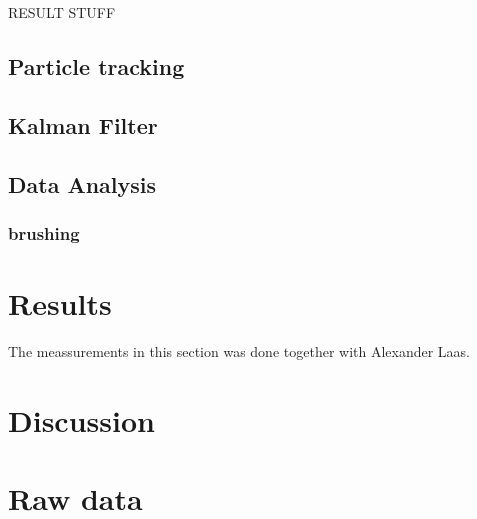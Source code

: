 \documentclass[]{report}
\begin{document}
RESULT STUFF


\section{Particle tracking}


\section{Kalman Filter}



\section{Data Analysis}


\subsection{brushing}

\chapter{Results}
The meassurements in this section was done together with Alexander Laas.


\chapter{Discussion}

\appendix
\chapter{Raw data}

%
%
%
%
%


\end{document}
